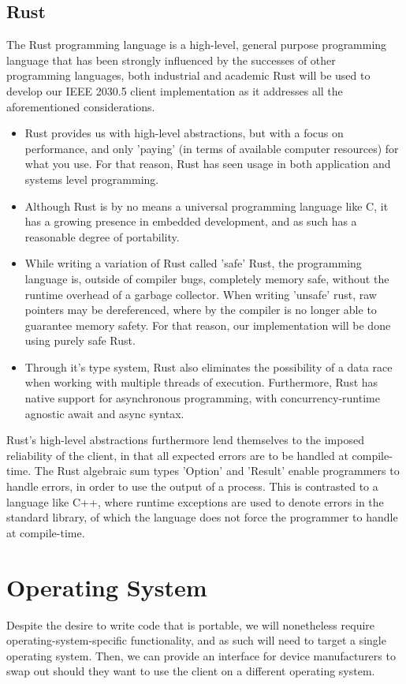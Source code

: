 \subsection{Rust}
The Rust programming language is a high-level, general purpose programming language that has been strongly influenced by the successes of other programming languages, both industrial and academic
Rust will be used to develop our IEEE 2030.5 client implementation as it addresses all the aforementioned considerations.

\begin{itemize}
    \item Rust provides us with high-level abstractions, but with a focus on performance, and only 'paying' (in terms of available computer resources) for what you use. For that reason, Rust has seen usage in both application and systems level programming.
    \item Although Rust is by no means a universal programming language like C, it has a growing presence in embedded development, and as such has a reasonable degree of portability.
    \item While writing a variation of Rust called 'safe' Rust, the programming language is, outside of compiler bugs, completely memory safe, without the runtime overhead of a garbage collector. When writing 'unsafe' rust, raw pointers may be dereferenced, where by the compiler is no longer able to guarantee memory safety. For that reason, our implementation will be done using purely safe Rust.
    \item Through it's type system, Rust also eliminates the possibility of a data race when working with multiple threads of execution. Furthermore, Rust has native support for asynchronous programming, with concurrency-runtime agnostic await and async syntax.
\end{itemize}

Rust's high-level abstractions furthermore lend themselves to the imposed reliability of the client, in that all expected errors are to be handled at compile-time. The Rust algebraic sum types 'Option' and 'Result' enable programmers to handle errors, in order to use the output of a process.
This is contrasted to a language like C++, where runtime exceptions are used to denote errors in the standard library, of which the language does not force the programmer to handle at compile-time.

\section{Operating System}
Despite the desire to write code that is portable, we will nonetheless require operating-system-specific functionality, and as such will need to target a single operating system. Then, we can provide an interface for device manufacturers to swap out should they want to use the client on a different operating system.

